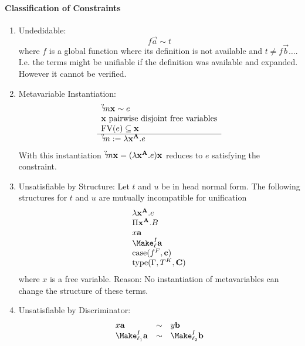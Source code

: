 \paragraph{Classification of Constraints}

\begin{enumerate}
    \item Undedidable:
        $$
            f \vec a \sim t
        $$
        where $f$ is a global function where its definition is not available and
        $t \ne f \vec b \ldots$.
        I.e. the terms might be unifiable if the definition
        was available and expanded. However it cannot be verified.

    \item Metavariable Instantiation:
        $$
        \begin{array}{l} 
            {{}^? \kern-0.2em m} {\mathbf x} \sim e
            \\
            {\mathbf x} \text{ pairwise disjoint free variables}
            \\
            {\text{FV}}(e) \subseteq {\mathbf x}
         \\ \hline 
            {{}^? \kern-0.2em m} := \lambda {{\mathbf x}^{{\mathbf A}}}. e
         \end{array}
        $$
        With this instantiation ${{}^? \kern-0.2em m} {\mathbf x} = (\lambda {{\mathbf x}^{{\mathbf A}}} .e) {\mathbf x}$ reduces to $e$ satisfying the constraint.

    \item Unsatisfiable by Structure: Let $t$ and $u$ be in head normal form.
        The following structures for $t$ and $u$ are mutually incompatible for
        unification
        $$
        \begin{array}{l}
            \lambda \fargs x A. e
            \\
            \Pi \fargs x A. B
            \\
            x \vec a
            \\
            \Make^I_\ell \vec a
            \\
            \case(f^F , \vec c)
            \\
            \type(\Gamma , T^K , \vec C)
        \end{array}
        $$
        where $x$ is a free variable. Reason: No instantiation of metavariables
        can change the structure of these terms.

    \item Unsatisfiable by Discriminator:
        $$
        \begin{array}{lll}
            x \vec a &\sim& y \vec b
            \\
            \Make^I_{\ell_1} \vec a &\sim& \Make^I_{\ell_2} \vec b
        \end{array}
        $$
\end{enumerate}








